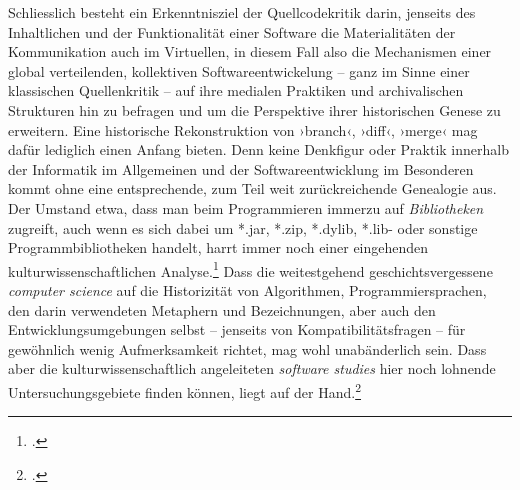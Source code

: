 \documentclass[a4paper,10pt]{article}
\newcommand{\inanf}[1]{›#1‹}
\begin{document}
Schliesslich besteht ein Erkenntnisziel der Quellcodekritik darin, jenseits des Inhaltlichen und der Funktionalität einer Software die Materialitäten der Kommunikation auch im Virtuellen, in diesem Fall also die Mechanismen einer global verteilenden, kollektiven Softwareentwickelung – ganz im Sinne einer klassischen Quellenkritik – auf ihre medialen Praktiken und archivalischen Strukturen hin zu befragen und um die Perspektive ihrer historischen Genese zu erweitern. Eine historische Rekonstruktion von \inanf{branch}, \inanf{diff}, \inanf{merge} mag dafür lediglich einen Anfang bieten. Denn keine Denkfigur oder Praktik innerhalb der Informatik im Allgemeinen und der Softwareentwicklung im Besonderen kommt ohne eine entsprechende, zum Teil weit zurückreichende Genealogie aus. Der Umstand etwa, dass man beim Programmieren immerzu auf \emph{Bibliotheken} zugreift, auch wenn es sich dabei um *.jar, *.zip, *.dylib, *.lib- oder sonstige Programmbibliotheken handelt, harrt immer noch einer eingehenden kulturwissenschaftlichen Analyse.\footcite[Einen eher künstlerischen Anatz, die Leistungen einer Programmbibliothek zu reflektieren, findet sich bei][weitergehende, die Metaphorik von \inanf{Bibliothek} und dem gesamten \inanf{Bibiliothekswesen} kritisch analysierende Untersuchungen, die Reichweite, Passgenauigkeit und Erkenntnisgewinn eines solchen semantischen Feldes im Bereich der Softwareentwicklung bilanzierten,  sind im Moment noch ein Desiderat.]{harwood:2008} Dass die weitestgehend geschichtsvergessene \emph{computer science} auf die Historizität von Algorithmen, Programmiersprachen, den darin verwendeten Metaphern und Bezeichnungen, aber auch den Entwicklungsumgebungen selbst – jenseits von Kompatibilitätsfragen – für gewöhnlich wenig Aufmerksamkeit richtet, mag wohl unabänderlich sein. Dass aber die kulturwissenschaftlich angeleiteten \emph{software studies} hier noch lohnende Untersuchungsgebiete finden können, liegt auf der Hand.\footcite[Vgl. als frühen produktiven Ansatz][]{hagen:1997}
\end{document}
